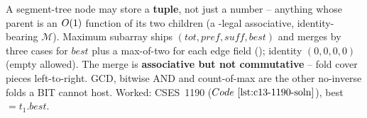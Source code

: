 \begin{recallbox}
A segment-tree node may store a \textbf{tuple}, not just a number -- anything
whose parent is an \(O(1)\) function of its two children (a
-legal associative, identity-bearing \(\mathcal{M}\)).
Maximum subarray ships \((\mathit{tot},\mathit{pref},\mathit{suff},\mathit{best})\)
and merges by three cases for \(\mathit{best}\) plus a max-of-two for each edge
field (); identity \((0,0,0,0)\) (empty allowed).  The merge
is \textbf{associative but not commutative} -- fold cover pieces left-to-right.
GCD, bitwise AND and count-of-max are the other no-inverse folds a BIT cannot
host.  Worked: CSES~1190 (\(\coderef{c13-1190-soln}\)), best \(=t_1.\mathit{best}\).
\end{recallbox}
